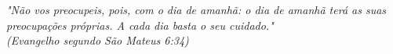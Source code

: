 \begin{epigrafe}
    \vspace*{\fill}
    \begin{flushright}
        \textit{"Não vos preocupeis, pois, com o dia de amanhã:
        o dia de amanhã terá as suas preocupações próprias.
        A cada dia basta o seu cuidado."\\
        (Evangelho segundo São Mateus 6:34)}
    \end{flushright}
\end{epigrafe}